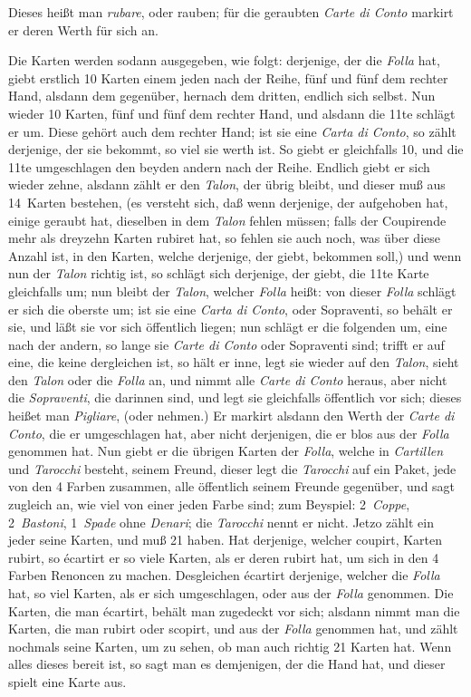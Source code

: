 \documentclass[11pt,a6paper,twoside]{article}
\begin{document}
Dieses heißt man \textit{rubare}, oder rauben; für die geraubten \textit{Carte di Conto} markirt er deren Werth für sich an.

Die Karten werden sodann ausgegeben, wie folgt: derjenige, der die \textit{Folla} hat, giebt erstlich 10 Karten einem jeden nach der Reihe, fünf und fünf dem rechter Hand, alsdann dem gegenüber, hernach dem dritten, endlich sich selbst. Nun wieder 10 Karten, fünf und fünf dem rechter Hand, und alsdann die 11te schlägt er um. Diese gehört auch dem rechter Hand; ist sie eine \textit{Carta di Conto}, so zählt derjenige, der sie bekommt, so viel sie werth ist. So giebt er gleichfalls 10, und die 11te umgeschlagen den beyden andern nach der Reihe. Endlich giebt er sich wieder zehne, alsdann zählt er den \textit{Talon}, der übrig bleibt, und dieser muß aus 14~Karten bestehen, (es versteht sich, daß wenn derjenige, der aufgehoben hat, einige geraubt hat, dieselben in dem \textit{Talon} fehlen müssen; falls der Coupirende mehr als dreyzehn Karten rubiret hat, so fehlen sie auch noch, was über diese Anzahl ist, in den Karten, welche derjenige, der giebt, bekommen soll,) und wenn nun der \textit{Talon} richtig ist, so schlägt sich derjenige, der giebt, die 11te Karte gleichfalls um; nun bleibt der \textit{Talon}, welcher \textit{Folla} heißt: von dieser \textit{Folla} schlägt er sich die oberste um; ist sie eine \textit{Carta di Conto}, oder Sopraventi, so behält er sie, und läßt sie vor sich öffentlich liegen; nun schlägt er die folgenden um, eine nach der andern, so lange sie \textit{Carte di Conto} oder Sopraventi sind; trifft er auf eine, die keine dergleichen ist, so hält er inne, legt sie wieder auf den \textit{Talon}, sieht den \textit{Talon} oder die \textit{Folla} an, und nimmt alle \textit{Carte di Conto} heraus, aber nicht die \textit{Sopraventi}, die darinnen sind, und legt sie gleichfalls öffentlich vor sich; dieses heißet man \textit{Pigliare}, (oder nehmen.) Er markirt alsdann den Werth der \textit{Carte di Conto}, die er umgeschlagen hat, aber nicht derjenigen, die er blos aus der \textit{Folla} genommen hat. Nun giebt er die übrigen Karten der \textit{Folla}, welche in \textit{Cartillen} und \textit{Tarocchi} besteht, seinem Freund, dieser legt die \textit{Tarocchi} auf ein Paket, jede von den 4 Farben zusammen, alle öffentlich seinem Freunde gegenüber, und sagt zugleich an, wie viel von einer jeden Farbe sind; zum Beyspiel: 2~\textit{Coppe}, 2~\textit{Bastoni}, 1~\textit{Spade} ohne \textit{Denari}; die \textit{Tarocchi} nennt er nicht. Jetzo zählt ein jeder seine Karten, und muß 21 haben. Hat derjenige, welcher coupirt, Karten rubirt, so écartirt er so viele Karten, als er deren rubirt hat, um sich in den 4 Farben Renoncen zu machen. Desgleichen écartirt derjenige, welcher die \textit{Folla} hat, so viel Karten, als er sich umgeschlagen, oder aus der \textit{Folla} genommen. Die Karten, die man écartirt, behält man zugedeckt vor sich; alsdann nimmt man die Karten, die man rubirt oder scopirt, und aus der \textit{Folla} genommen hat, und zählt nochmals seine Karten, um zu sehen, ob man auch richtig 21 Karten hat. Wenn alles dieses bereit ist, so sagt man es demjenigen, der die Hand hat, und dieser spielt eine Karte aus.
\end{document}
